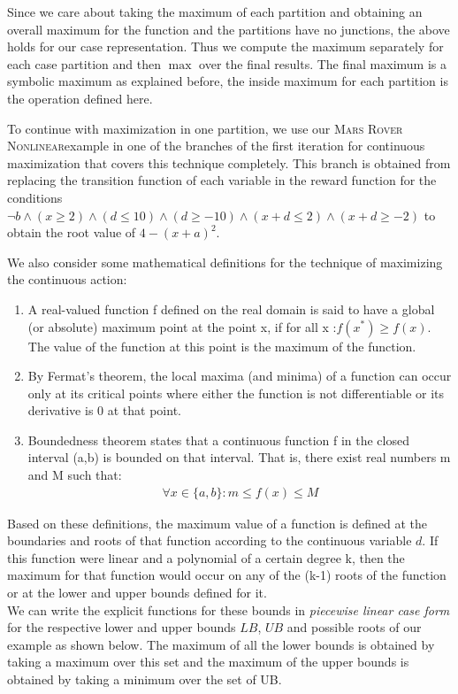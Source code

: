 \documentclass[letterpaper]{article}
\newcommand{\MarsRoverNL}{\textsc{Mars Rover Nonlinear}}
\begin{document}
Since we care about taking the maximum of each partition and obtaining an overall maximum for the function and the partitions have no junctions, the above holds for our case representation. Thus we compute the maximum separately for each case partition and then $\max$ over the final results. The final maximum is a symbolic maximum as explained before, the inside maximum for each partition is the operation defined here. 

To continue with maximization in one partition, we use our \MarsRoverNL example in one of the branches of the first iteration for continuous maximization that covers this technique completely. This branch is obtained from replacing the transition function of each variable in the reward function for the conditions $ \neg b\wedge (x\geq 2)\wedge (d\leq 10) \wedge (d\geq -10)\wedge  (x+d\leq 2) \wedge (x+d\geq -2) $ to obtain the root value of $ 4 - (x+a)^2 $.

We also consider some mathematical definitions for the technique of maximizing the continuous action: 
\begin{enumerate}
\item A real-valued function f defined on the real domain is said to have a global (or absolute) maximum point at the point x, if for all x :$ f(x^{*}) \geq f(x) $. The value of the function at this point is the maximum of the function.
\item By Fermat's theorem, the local maxima (and minima) of a function can occur only at its critical points where either the function is not differentiable or its derivative is 0 at that point. 
\item Boundedness theorem states that a continuous function f in the closed interval (a,b) is bounded on that interval. That is, there exist real numbers m and M such that:
\begin{align*}
\forall x \in \{a,b\} : m \leq f(x) \leq M 
\end{align*}
\end{enumerate}

Based on these definitions, the maximum value of a function is defined at the boundaries and roots of that function according to the continuous variable $d$. If this function were linear and a polynomial of a certain degree k, then the maximum for that function would occur on any of the (k-1) roots of the function or at the lower and upper bounds defined for it.
\\We can write the explicit functions for these bounds in  \emph{piecewise linear case form} for the respective lower and upper bounds $LB$, $UB$ and possible roots of our example as shown below. The maximum of all the lower bounds is obtained by taking a maximum over this set and the maximum of the upper bounds is obtained by taking a minimum over the set of UB.
\end{document}
